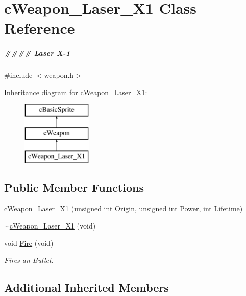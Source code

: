 \hypertarget{classc_weapon___laser___x1}{\section{c\-Weapon\-\_\-\-Laser\-\_\-\-X1 Class Reference}
\label{classc_weapon___laser___x1}
}


\subparagraph*{\#\#\#\# Laser X-\/1} 




{\ttfamily \#include $<$weapon.\-h$>$}

Inheritance diagram for c\-Weapon\-\_\-\-Laser\-\_\-\-X1\-:\begin{figure}[H]
\begin{center}
\leavevmode
\includegraphics[height=3.000000cm]{classc_weapon___laser___x1}
\end{center}
\end{figure}
\subsection*{Public Member Functions}
\begin{DoxyCompactItemize}
\item 
\hyperlink{classc_weapon___laser___x1_ac1b9bbf377db4b807194d45983d14d90}{c\-Weapon\-\_\-\-Laser\-\_\-\-X1} (unsigned int \hyperlink{classc_weapon_a2a521dd1a2aa10d5f6c0b45c09932519}{Origin}, unsigned int \hyperlink{classc_weapon_aa33960894f9ca703e3b3ad6a9f7f3f67}{Power}, int \hyperlink{classc_weapon_a7bc9a58e30a80556ba83e32067657b74}{Lifetime})
\item 
\hyperlink{classc_weapon___laser___x1_a4f741a67f64a8c51e8a29afd515553da}{$\sim$c\-Weapon\-\_\-\-Laser\-\_\-\-X1} (void)
\item 
void \hyperlink{classc_weapon___laser___x1_a9257307d7f8c8fb81231f23fe9e872ba}{Fire} (void)
\begin{DoxyCompactList}\small\item\em Fires an Bullet. \end{DoxyCompactList}\end{DoxyCompactItemize}
\subsection*{Additional Inherited Members}


